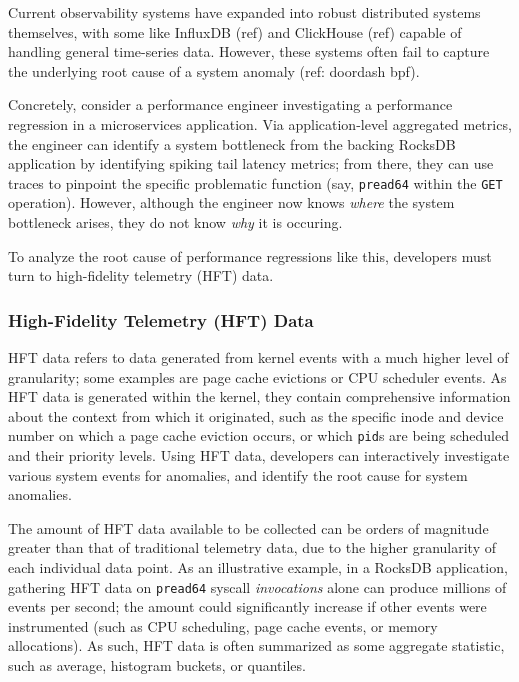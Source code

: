 Current observability systems have expanded into robust distributed systems themselves, with some
like InfluxDB (ref) and ClickHouse (ref) capable of handling general time-series data. However,
these systems often fail to capture the underlying root cause of a system anomaly (ref: doordash bpf).

Concretely, consider a performance engineer investigating a performance regression in a
microservices application. Via application-level aggregated metrics, the engineer can identify a
system bottleneck from the backing RocksDB application by identifying spiking tail latency metrics;
from there, they can use traces to pinpoint the specific problematic function (say, \texttt{pread64}
within the \texttt{GET} operation). However, although the engineer now knows \textit{where} the
system bottleneck arises, they do not know \textit{why} it is occuring. 

To analyze the root cause of performance regressions like this, developers must turn to
high-fidelity telemetry (HFT) data.

\subsubsection{High-Fidelity Telemetry (HFT) Data}

HFT data refers to data generated from kernel events with a much higher level of granularity; some
examples are page cache evictions or CPU scheduler events. As HFT data is generated within the
kernel, they contain comprehensive information about the context from which it originated, such as
the specific inode and device number on which a page cache eviction occurs, or which \texttt{pid}s
are being scheduled and their priority levels. Using HFT data, developers can interactively
investigate various system events for anomalies, and identify the root cause for system anomalies.

The amount of HFT data available to be collected can be orders of magnitude greater than that of
traditional telemetry data, due to the higher granularity of each individual data point. As an
illustrative example, in a RocksDB application, gathering HFT data on \texttt{pread64} syscall
\textit{invocations} alone can produce millions of events per second; the amount could significantly
increase if other events were instrumented (such as CPU scheduling, page cache events, or memory
allocations). As such, HFT data is often summarized as some aggregate statistic, such as average,
histogram buckets, or quantiles.

